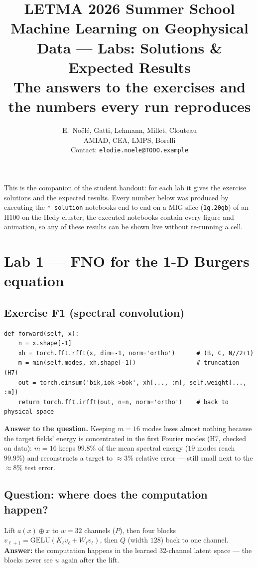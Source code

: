 \documentclass[11pt,a4paper]{article}
\title{\vspace{-1.2cm}\textbf{LETMA 2026 Summer School}\\[2pt]
\textbf{Machine Learning on Geophysical Data --- Labs: Solutions \& Expected Results}\\[6pt]
\large The answers to the exercises and the numbers every run reproduces}
\author{\small E.~No\"el\'e, Gatti, Lehmann, Millet, Clouteau\\ \small AMIAD, CEA, LMPS, Borelli\\ \small Contact: \texttt{elodie.noele@TODO.example}}
\date{}
\begin{document}
\maketitle
\vspace{-6mm}

This is the companion of the student handout: for each lab it gives the exercise solutions
and the expected results. Every number below was produced by executing the
\texttt{*\_solution} notebooks end to end on a MIG slice (\texttt{1g.20gb}) of an H100 on the
Hedy cluster; the executed notebooks contain every figure and animation, so any of these
results can be shown live without re-running a cell.

\section{Lab 1 --- FNO for the 1-D Burgers equation}

\subsection*{Exercise F1 (spectral convolution)}
\begin{lstlisting}
def forward(self, x):
    n = x.shape[-1]
    xh = torch.fft.rfft(x, dim=-1, norm='ortho')      # (B, C, N//2+1)
    m = min(self.modes, xh.shape[-1])                 # truncation (H7)
    out = torch.einsum('bik,iok->bok', xh[..., :m], self.weight[..., :m])
    return torch.fft.irfft(out, n=n, norm='ortho')    # back to physical space
\end{lstlisting}
\textbf{Answer to the question.} Keeping $m=16$ modes loses almost nothing because the target
fields' energy is concentrated in the first Fourier modes (H7, checked on data): $m=16$ keeps
$99.8\%$ of the mean spectral energy ($19$ modes reach $99.9\%$) and reconstructs a target to
$\approx 3\%$ relative error --- still small next to the $\approx 8\%$ test error.

\subsection*{Question: where does the computation happen?}
Lift $a(x)\oplus x$ to $w=32$ channels ($P$), then four blocks
$v_{\ell+1}=\mathrm{GELU}(K_\ell v_\ell + W_\ell v_\ell)$, then $Q$ (width $128$) back to one
channel. \textbf{Answer:} the computation happens in the learned 32-channel latent space
--- the blocks never see $u$ again after the lift.
\end{document}
